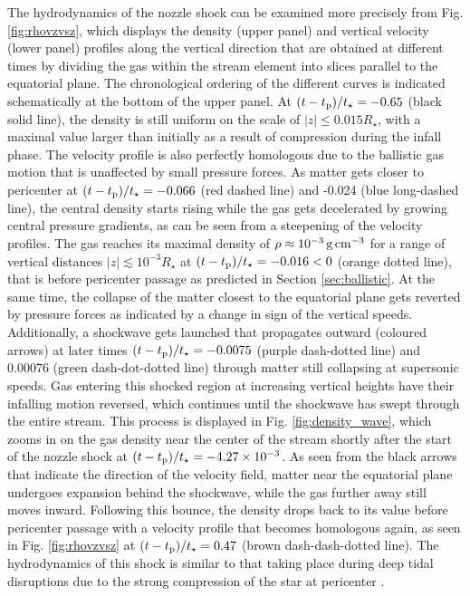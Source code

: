 \documentclass[a4paper,fleqn,usenatbib]{mnras}
\newcommand{\rstar}{R_{\star}}
\newcommand{\tp}{t_{\rm p}}
\newcommand{\tstar}{t_{\star}}
\def\gpercm3{\, \rm g \, cm^{-3}}
\begin{document}
The hydrodynamics of the nozzle shock can be examined more precisely from Fig. \ref{fig:rhovzvsz}, which displays the density (upper panel) and vertical velocity (lower panel) profiles along the vertical direction that are obtained at different times by dividing the gas within the stream element into slices parallel to the equatorial plane. The chronological ordering of the different curves is indicated schematically at the bottom of the upper panel. At $(t-\tp)/\tstar = -0.65$ (black solid line), the density is still uniform on the scale of $|z| \leq 0.015 \rstar$, with a maximal value larger than initially as a result of compression during the infall phase. The velocity profile is also perfectly homologous due to the ballistic gas motion that is unaffected by small pressure forces. As matter gets closer to pericenter at $(t-\tp)/\tstar = -0.066$ (red dashed line) and -0.024 (blue long-dashed line), the central density starts rising while the gas gets decelerated by growing central pressure gradients, as can be seen from a steepening of the velocity profiles. The gas reaches its maximal density of $\rho \approx 10^{-3} \gpercm3$ for a range of vertical distances $|z| \lesssim 10^{-3} \rstar$ at $(t-\tp)/\tstar = -0.016<0$ (orange dotted line), that is before pericenter passage as predicted in Section \ref{sec:ballistic}. At the same time, the collapse of the matter closest to the equatorial plane gets reverted by pressure forces as indicated by a change in sign of the vertical speeds. Additionally, a shockwave gets launched that propagates outward (coloured arrows) at later times $(t-\tp)/\tstar = -0.0075$ (purple dash-dotted line) and 0.00076 (green dash-dot-dotted line) through matter still collapsing at supersonic speeds. Gas entering this shocked region at increasing vertical heights have their infalling motion reversed, which continues until the shockwave has swept through the entire stream. This process is displayed in Fig. \ref{fig:density_wave}, which zooms in on the gas density near the center of the stream shortly after the start of the nozzle shock at $(t-\tp)/\tstar = -4.27 \times 10^{-3}$. As seen from the black arrows that indicate the direction of the velocity field, matter near the equatorial plane undergoes expansion behind the shockwave, while the gas further away still moves inward. Following this bounce, the density drops back to its value before pericenter passage with a velocity profile that becomes homologous again, as seen in Fig. \ref{fig:rhovzvsz} at $(t-\tp)/\tstar = 0.47$ (brown dash-dash-dotted line). The hydrodynamics of this shock is similar to that taking place during deep tidal disruptions due to the strong compression of the star at pericenter \citep{guillochon2009,brassart2010}.
\end{document}
